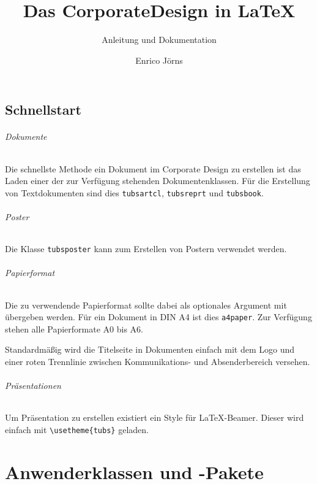 \documentclass[a4paper,11pt]{tubsreprt}
\title{Das CorporateDesign in \LaTeX}
\subtitle{Anleitung und Dokumentation}
\author{Enrico Jörns}
\begin{document}
\maketitle
\pagestyle{scrheadings}
\tableofcontents


\newcommand{\newdocumentclass}[1]{\textcolor{tuRed}{\lstinline{#1}}}

\chapter{Schnellstart}

\paragraph{Dokumente}
Die schnellste Methode ein Dokument im Corporate Design zu erstellen ist
das Laden einer der zur Verfügung stehenden Dokumentenklassen.
Für die Erstellung von Textdokumenten sind dies \newdocumentclass{tubsartcl},
\newdocumentclass{tubsreprt} und \newdocumentclass{tubsbook}.

\paragraph{Poster}
Die Klasse \newdocumentclass{tubsposter} kann zum Erstellen von Postern verwendet werden.

\paragraph{Papierformat}
Die zu verwendende Papierformat sollte dabei als optionales Argument mit
übergeben werden. Für ein Dokument in DIN A4 ist dies \texttt{a4paper}.
Zur Verfügung stehen alle Papierformate A0 bis A6.

Standardmäßig wird die Titelseite in Dokumenten einfach mit dem Logo und einer
roten Trennlinie zwischen Kommunikations- und Absenderbereich versehen.

\paragraph{Präsentationen}
Um Präsentation zu erstellen existiert ein Style für \LaTeX-Beamer.
Dieser wird einfach mit \lstinline!\usetheme{tubs}! geladen.

\part{Anwenderklassen und -Pakete}
\end{document}
